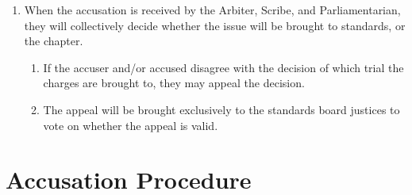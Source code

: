 	\begin{enumerate}
		\item When the accusation is received by the Arbiter, Scribe, and Parliamentarian, they will collectively decide whether the issue will be brought to standards, or the chapter.
			\begin{enumerate}
				\item If the accuser and/or accused disagree with the decision of which trial the charges are brought to, they may appeal the decision.
				\item The appeal will be brought exclusively to the standards board justices to vote on whether the appeal is valid.
			\end{enumerate}

	\end{enumerate}

\section{Accusation Procedure}

